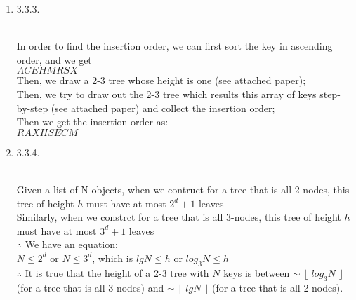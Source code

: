 \documentclass[11pt]{article}
\begin{document}
\begin{enumerate}
\item 3.3.3.
\begin{solution}\\
In order to find the insertion order, we can first sort the key in ascending order, and we get\\
$A C E H M R S X$\\
Then, we draw a 2-3 tree whose height is one (see attached paper);\\
Then, we try to draw out the 2-3 tree which results this array of keys step-by-step (see attached paper) and collect the insertion order;\\
Then we get the insertion order as:\\
$R A X H S E C M$\\
\end{solution}

\break

\item 3.3.4.
\begin{solution}\\
Given a list of N objects, when we contruct for a tree that is all 2-nodes, this tree of height $h$ must have at most $2^d+1$ leaves\\
Similarly, when we constrct for a tree that is all 3-nodes, this tree of height $h$ must have at most $3^d+1$ leaves\\
$\therefore$ We have an equation:\\
$N \leq 2^d$ or $N \leq 3^d$, which is $lgN \leq h$ or $log_3N \leq h$ \\
$\therefore$ It is true that the height of a 2-3 tree with $N$ keys is between $\sim$ $\lfloor$ $log_3N$ $\rfloor$ (for a tree that is all 3-nodes) and $\sim$ $\lfloor$ $lgN$ $\rfloor$ (for a tree that is all 2-nodes).
\end{solution}


\end{enumerate}
\end{document}
